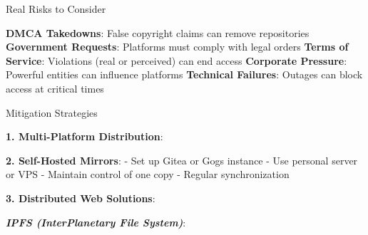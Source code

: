 Real Risks to Consider

\textbf{DMCA Takedowns}: False copyright claims can remove repositories
\textbf{Government Requests}: Platforms must comply with legal orders
\textbf{Terms of Service}: Violations (real or perceived) can end access
\textbf{Corporate Pressure}: Powerful entities can influence platforms
\textbf{Technical Failures}: Outages can block access at critical times

Mitigation Strategies

\textbf{1. Multi-Platform Distribution}:

\begin{Shaded}
\begin{Highlighting}[]

\end{Highlighting}
\end{Shaded}

\textbf{2. Self-Hosted Mirrors}: - Set up Gitea or Gogs instance - Use
personal server or VPS - Maintain control of one copy - Regular
synchronization

\textbf{3. Distributed Web Solutions}:

\textbf{\emph{IPFS (InterPlanetary File System)}}:

\begin{Shaded}
\begin{Highlighting}[]


\end{Highlighting}
\end{Shaded}

